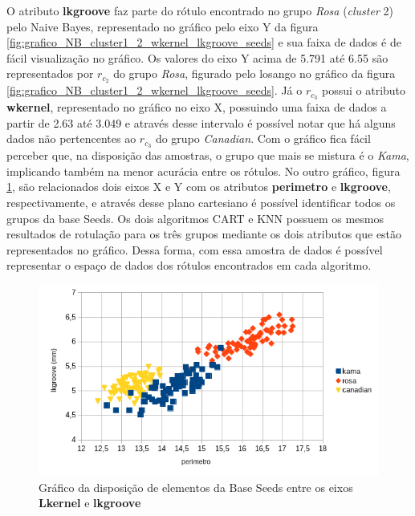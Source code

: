 O atributo \textbf{lkgroove} faz parte do rótulo encontrado no grupo \textit{Rosa} (\textit{cluster} 2) pelo Naive Bayes, representado no gráfico pelo eixo Y da figura \ref{fig:grafico_NB_cluster1_2_wkernel_lkgroove_seeds}   e sua faixa de dados é de fácil visualização no gráfico. Os valores do eixo Y acima de 5.791 até 6.55 são representados por  ${r_{c_2}}$ do grupo \textit{Rosa}, figurado pelo losango no gráfico da figura \ref{fig:grafico_NB_cluster1_2_wkernel_lkgroove_seeds}. Já o ${r_{c_3}}$ possui o atributo \textbf{wkernel}, representado no gráfico no eixo X, possuindo uma faixa de dados a partir de 2.63 até 3.049 e através desse intervalo é possível notar que há alguns dados não pertencentes ao ${r_{c_3}}$ do grupo \textit{Canadian}. Com o gráfico fica fácil perceber que, na disposição das amostras, o grupo que mais se mistura é o \textit{Kama}, implicando também na menor acurácia entre os rótulos. No outro gráfico, figura \ref{fig:grafico_CART_KNN_SEEDS_perimetro_lkgroove}, são relacionados dois eixos X e Y com os atributos \textbf{perimetro} e \textbf{lkgroove}, respectivamente, e através desse plano cartesiano é possível identificar todos os grupos da base Seeds. Os dois algoritmos CART e KNN possuem os mesmos resultados de rotulação para os três grupos mediante os dois atributos que estão representados no gráfico. Dessa forma, com essa amostra de dados é possível representar o espaço de dados dos rótulos encontrados em cada algoritmo. 

\begin{figure}[h!]
        \centering
        \includegraphics[scale=0.9]{figs/grafico_CART_KNN_SEEDS_perimetro_lkgroove.png}
        \caption{Gráfico da disposição de elementos da Base Seeds entre os eixos \textbf{Lkernel} e \textbf{lkgroove}} \label{fig:grafico_CART_KNN_SEEDS_perimetro_lkgroove}
\end{figure}


